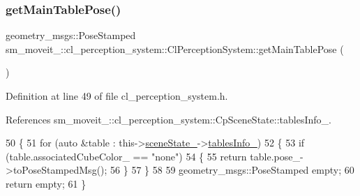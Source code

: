 \subsubsection{\texorpdfstring{get\+Main\+Table\+Pose()}{getMainTablePose()}}
{\footnotesize\ttfamily geometry\+\_\+msgs\+::\+Pose\+Stamped sm\+\_\+moveit\+\_\+::cl\+\_\+perception\+\_\+system\+::\+Cl\+Perception\+System\+::get\+Main\+Table\+Pose (\begin{DoxyParamCaption}{ }\end{DoxyParamCaption})\hspace{0.3cm}{\ttfamily [inline]}}



Definition at line 49 of file cl\+\_\+perception\+\_\+system.\+h.



References sm\+\_\+moveit\+\_\+::cl\+\_\+perception\+\_\+system\+::\+Cp\+Scene\+State\+::tables\+Info\+\_\+.


\begin{DoxyCode}
50             \{
51                 \textcolor{keywordflow}{for} (\textcolor{keyword}{auto} &table : this->\hyperlink{classsm__moveit__4_1_1cl__perception__system_1_1ClPerceptionSystem_a82ea8feeb2fa43349f91ed59137b3890}{sceneState\_}->\hyperlink{classsm__moveit__4_1_1cl__perception__system_1_1CpSceneState_a95f74dd16566d97e017650ccdf4b8a46}{tablesInfo\_})
52                 \{
53                     \textcolor{keywordflow}{if} (table.associatedCubeColor\_ == \textcolor{stringliteral}{"none"})
54                     \{
55                         \textcolor{keywordflow}{return} table.pose\_->toPoseStampedMsg();
56                     \}
57                 \}
58 
59                 geometry\_msgs::PoseStamped empty;
60                 \textcolor{keywordflow}{return} empty;
61             \}
\end{DoxyCode}
\mbox{\label{classsm__moveit__4_1_1cl__perception__system_1_1ClPerceptionSystem_ac4b944cebb2055a85a33129665df5dcf}} 
